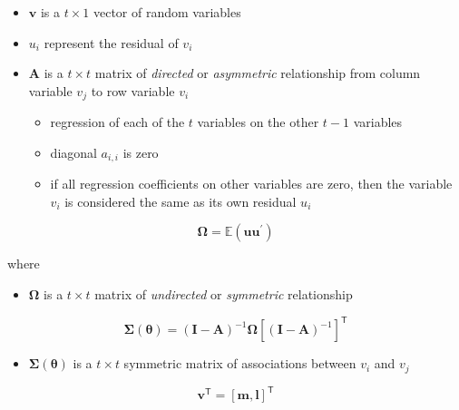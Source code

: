 \documentclass[
]{book}
\providecommand{\tightlist}{%
  \setlength{\itemsep}{0pt}\setlength{\parskip}{0pt}}
\begin{document}
\begin{itemize}
\tightlist
\item
  \(\mathbf{v}\) is a \(t \times 1\) vector of random variables
\item
  \(u_i\) represent the residual of \(v_i\)
\item
  \(\mathbf{A}\) is a \(t \times t\) matrix of \emph{directed} or \emph{asymmetric} relationship
  from column variable \(v_j\) to row variable \(v_i\)

  \begin{itemize}
  \tightlist
  \item
    regression of each of the \(t\) variables on the other \(t - 1\) variables
  \item
    diagonal \(a_{i,i}\) is zero
  \item
    if all regression coefficients on other variables are zero,
    then the variable \(v_i\) is considered the same as its own residual \(u_i\)
  \end{itemize}
\end{itemize}

\begin{equation}
  \boldsymbol{\Omega}
  =
  \mathbb{E}
  \left(
    \mathbf{u} \mathbf{u}^{\prime}
  \right)
\end{equation}

\noindent where

\begin{itemize}
\tightlist
\item
  \(\boldsymbol{\Omega}\) is a \(t \times t\) matrix of \emph{undirected} or \emph{symmetric} relationship
\end{itemize}

\begin{equation}
  \boldsymbol{\Sigma} \left( \boldsymbol{\theta} \right)
  =
  \left( \mathbf{I} - \mathbf{A} \right)^{-1}
  \boldsymbol{\Omega}
  \left[ \left( \mathbf{I} - \mathbf{A} \right)^{-1} \right]^{\mathsf{T}}
\end{equation}

\begin{itemize}
\tightlist
\item
  \(\boldsymbol{\Sigma} \left( \boldsymbol{\theta} \right)\) is a \(t \times t\) symmetric matrix
  of associations between \(v_i\) and \(v_j\)
\end{itemize}

\begin{equation}
  \mathbf{v}^{\mathsf{T}}
  =
  \left[
    \mathbf{m}, \mathbf{l}
  \right]^{\mathsf{T}}
\end{equation}
\end{document}

